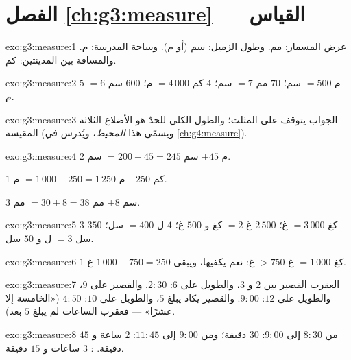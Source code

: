 \section*{الفصل \ref{ch:g3:measure} --- القياس}

\begin{solution}{exo:g3:measure:1}
عرض المسمار: مم. وطول الزميل: سم (أو م). وساحة المدرسة: م.
والمسافة بين المدينتين: كم.
\end{solution}

\begin{solution}{exo:g3:measure:2}
$5$ م $= 500$ سم؛ \quad $70$ مم $= 7$ سم؛ \quad
$4$ كم $= 4\,000$ م؛ \quad $600$ سم $= 6$ م.
\end{solution}

\begin{solution}{exo:g3:measure:3}
الجواب يتوقف على المثلث؛ والطول الكلي للحدّ هو
 الأضلاع الثلاثة المقيسة (ويسمّى هذا 
\emph{المحيط}، ويُدرس في \cref{ch:g4:measure}).
\end{solution}

\begin{solution}{exo:g3:measure:4}
$2$ م $+ 45$ سم $= 200 + 45 = 245$ سم.

$1$ كم $+ 250$ م $= 1\,000 + 250 = 1\,250$ م.

$3$ سم $+ 8$ مم $= 30 + 8 = 38$ مم.
\end{solution}

\begin{solution}{exo:g3:measure:5}
$3$ كغ $= 3\,000$ غ؛ \quad $2\,500$ غ $= 2$ كغ و $500$ غ؛ \quad
$4$ ل $= 400$ سل؛ \quad $350$ سل $= 3$ ل و $50$ سل.
\end{solution}

\begin{solution}{exo:g3:measure:6}
$1$ كغ $= 1\,000$ غ $> 750$ غ: نعم يكفيها، ويبقى
$1\,000 - 750 = 250$ غ.
\end{solution}

\begin{solution}{exo:g3:measure:7}
العقرب القصير بين $2$ و $3$، والطويل على $6$: $2{:}30$.
والقصير على $9$، والطويل على $12$: $9{:}00$. والقصير يكاد
يبلغ $5$، والطويل على $10$: $4{:}50$ («الخامسة إلا عشرًا» ---
فعقرب الساعات لم يبلغ $5$ بعد).
\end{solution}

\begin{solution}{exo:g3:measure:8}
من $8{:}30$ إلى $9{:}00$: $30$ دقيقة؛ ومن $9{:}00$ إلى $11{:}45$:
$2$ ساعة و $45$ دقيقة. : $3$ ساعات و $15$ دقيقة.
\end{solution}


